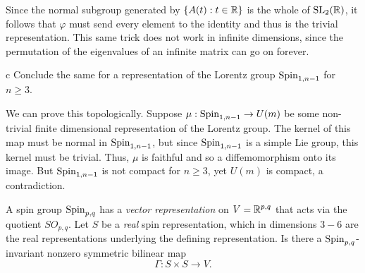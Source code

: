 \documentclass{pset}
\begin{document}
\begin{parts}
  Since the normal subgroup generated by $\{A(t) : t\in \mathbb{R} \}$ is the whole of $\mathrm{SL}_2(\mathbb{R})$, it follows that $\varphi$ must send every element to the identity and thus is the trivial representation. This same trick does not work in infinite dimensions, since the permutation of the eigenvalues of an infinite matrix can go on forever.

  \begin{part}{c}
    Conclude the same for a representation of the Lorentz group $\mathrm{Spin}_{1, n-1}$ for $n\geq 3$.
  \end{part}

  We can prove this topologically. Suppose $\mu : \mathrm{Spin}_{1,n-1} \to U(m)$ be some non-trivial finite dimensional representation of the Lorentz group. The kernel of this map must be normal in $\mathrm{Spin}_{1,n-1}$, but since $\mathrm{Spin}_{1,n-1}$ is a simple Lie group, this kernel must be trivial. Thus, $\mu$ is faithful and so a diffemomorphism onto its image. But $\mathrm{Spin}_{1,n-1}$ is not compact for $n\geq 3$, yet $U(m)$ is compact, a contradiction.
\end{parts}

\begin{problem}{2}
  A spin group $\mathrm{Spin}_{p,q}$ has a \emph{vector representation} on $V=\mathbb{R}^{p,q}$ that acts via the quotient $SO_{p,q}$. Let $S$ be a \emph{real} spin representation, which in dimensions $3-6$ are the real representations underlying the defining representation. Is there a $\mathrm{Spin}_{p,q}$-invariant nonzero symmetric bilinear map
  \[
    \Gamma : S \times S \to V.
  \]
\end{problem}
\end{document}
